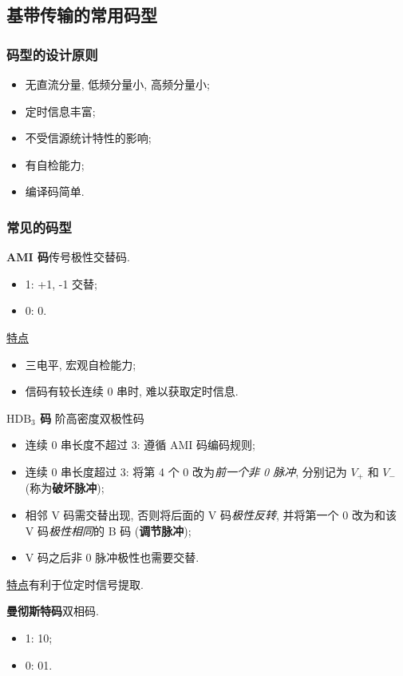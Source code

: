\subsection{基带传输的常用码型}
\subsubsection{码型的设计原则}
\begin{itemize}
    \item 无直流分量, 低频分量小, 高频分量小;
    \item 定时信息丰富;
    \item 不受信源统计特性的影响;
    \item 有自检能力;
    \item 编译码简单.
\end{itemize}

\subsubsection{常见的码型}
\textbf{AMI 码}\quad 传号极性交替码.
\begin{itemize}
    \item 1: +1, -1 交替;
    \item 0: 0.
\end{itemize}

\underline{特点}
\begin{itemize}
    \item 三电平, 宏观自检能力;
    \item 信码有较长连续 0 串时, 难以获取定时信息.
\end{itemize}

\textbf{$\text{HDB}_3$ 码} 阶高密度双极性码
\begin{itemize}
    \item 连续 0 串长度不超过 3: 遵循 AMI 码编码规则;
    \item 连续 0 串长度超过 3: 将第 4 个 0 改为\textit{前一个非 0 脉冲}, 分别记为 $V_+$ 和 $V_-$ (称为\textbf{破坏脉冲});
    \item 相邻 V 码需交替出现, 否则将后面的 V 码\textit{极性反转}, 并将第一个 0 改为和该 V 码\textit{极性相同}的 B 码 (\textbf{调节脉冲});
    \item V 码之后非 0 脉冲极性也需要交替.
\end{itemize}

\underline{特点}\quad 有利于位定时信号提取.

\textbf{曼彻斯特码}\quad 双相码.
\begin{itemize}
    \item 1: 10;
    \item 0: 01.
\end{itemize}


